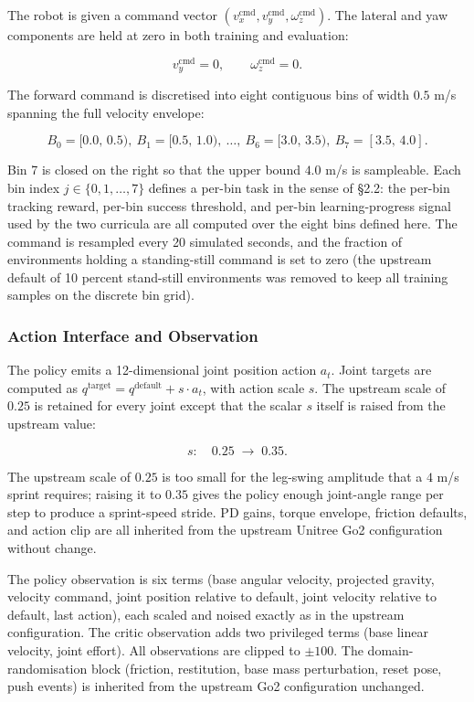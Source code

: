The robot is given a command vector $(v_x^{\mathrm{cmd}}, v_y^{\mathrm{cmd}}, \omega_z^{\mathrm{cmd}})$. The lateral and yaw components are held at zero in both training and evaluation:

\[
v_y^{\mathrm{cmd}} = 0, \qquad \omega_z^{\mathrm{cmd}} = 0.
\]

The forward command is discretised into eight contiguous bins of width $0.5$ m/s spanning the full velocity envelope:

\[
B_0 = [0.0,\, 0.5),\ B_1 = [0.5,\, 1.0),\ \ldots,\ B_6 = [3.0,\, 3.5),\ B_7 = [3.5,\, 4.0].
\]

Bin 7 is closed on the right so that the upper bound $4.0$ m/s is sampleable. Each bin index $j \in \{0, 1, \ldots, 7\}$ defines a per-bin task in the sense of \S2.2: the per-bin tracking reward, per-bin success threshold, and per-bin learning-progress signal used by the two curricula are all computed over the eight bins defined here. The command is resampled every 20 simulated seconds, and the fraction of environments holding a standing-still command is set to zero (the upstream default of 10 percent stand-still environments was removed to keep all training samples on the discrete bin grid).

\subsubsection{Action Interface and Observation}

The policy emits a 12-dimensional joint position action $a_t$. Joint targets are computed as $q^{\mathrm{target}} = q^{\mathrm{default}} + s \cdot a_t$, with action scale $s$. The upstream scale of $0.25$ is retained for every joint except that the scalar $s$ itself is raised from the upstream value:

\[
s : \quad 0.25 \;\longrightarrow\; 0.35.
\]

The upstream scale of $0.25$ is too small for the leg-swing amplitude that a $4$ m/s sprint requires; raising it to $0.35$ gives the policy enough joint-angle range per step to produce a sprint-speed stride. PD gains, torque envelope, friction defaults, and action clip are all inherited from the upstream Unitree Go2 configuration without change.

The policy observation is six terms (base angular velocity, projected gravity, velocity command, joint position relative to default, joint velocity relative to default, last action), each scaled and noised exactly as in the upstream configuration. The critic observation adds two privileged terms (base linear velocity, joint effort). All observations are clipped to $\pm 100$. The domain-randomisation block (friction, restitution, base mass perturbation, reset pose, push events) is inherited from the upstream Go2 configuration unchanged.

